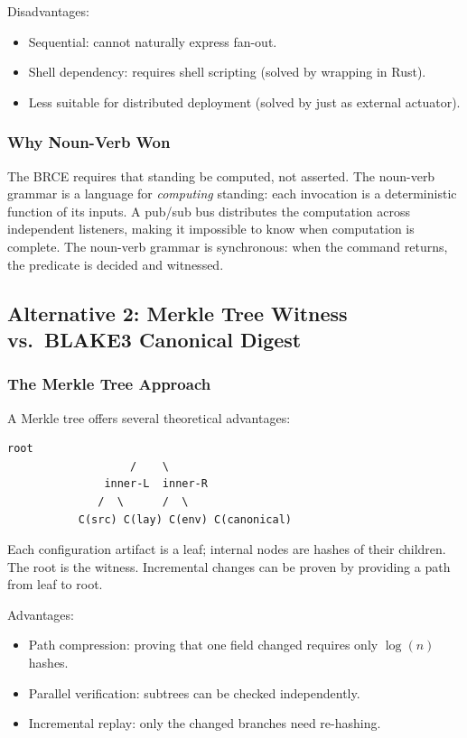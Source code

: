 Disadvantages:
\begin{itemize}
  \item Sequential: cannot naturally express fan-out.
  \item Shell dependency: requires shell scripting (solved by wrapping in Rust).
  \item Less suitable for distributed deployment (solved by just as external actuator).
\end{itemize}

\subsubsection{Why Noun-Verb Won}

The BRCE requires that standing be computed, not asserted. The noun-verb grammar is a language for \emph{computing} standing: each invocation is a deterministic function of its inputs. A pub/sub bus distributes the computation across independent listeners, making it impossible to know when computation is complete. The noun-verb grammar is synchronous: when the command returns, the predicate is decided and witnessed.

\subsection{Alternative 2: Merkle Tree Witness vs.\ BLAKE3 Canonical Digest}

\subsubsection{The Merkle Tree Approach}

A Merkle tree offers several theoretical advantages:

\begin{lstlisting}[caption={Merkle tree structure for configuration witness}]
                    root
                   /    \
               inner-L  inner-R
              /  \      /  \
           C(src) C(lay) C(env) C(canonical)
\end{lstlisting}

Each configuration artifact is a leaf; internal nodes are hashes of their children. The root is the witness. Incremental changes can be proven by providing a path from leaf to root.

Advantages:
\begin{itemize}
  \item Path compression: proving that one field changed requires only $\log(n)$ hashes.
  \item Parallel verification: subtrees can be checked independently.
  \item Incremental replay: only the changed branches need re-hashing.
\end{itemize}

